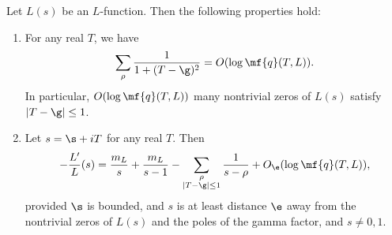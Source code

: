 \documentclass[12pt]{article}
\begin{document}
      \begin{lemma}\label{lem:powerful_L-function_approximation_lemma}
        Let \(L(s)\) be an \(L\)-function. Then the following properties hold:
        \begin{enumerate}[label*=(\roman*)]
          \item For any real \(T\), we have
          \[
            \sum_{\rho}\frac{1}{1+(T-\g)^{2}} = O(\log{\mf{q}(T,L)}).
          \]
          In particular, \(O(\log{\mf{q}(T,L)})\) many nontrivial zeros of \(L(s)\) satisfy \(|T-\g| \le 1\).
          \item Let \(s = \s+iT\) for any real \(T\). Then
          \[
            -\frac{L'}{L}(s) = \frac{m_{L}}{s}+\frac{m_{L}}{s-1}-\sum_{\substack{\rho \\ |T-\g| \le 1}}\frac{1}{s-\rho}+O_{\e}(\log{\mf{q}(T,L)}),
          \]
          provided \(\s\) is bounded, and \(s\) is at least distance \(\e\) away from the nontrivial zeros of \(L(s)\) and the poles of the gamma factor, and \(s \neq 0,1\).
        \end{enumerate}
      \end{lemma}
\end{document}
